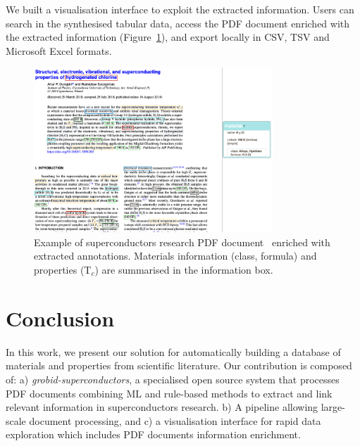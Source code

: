 \documentclass{article}
\newcommand{\tc}{T$_{c}$}
\begin{document}



We built a visualisation interface to exploit the extracted information. 
Users can search in the synthesised tabular data, access the PDF document enriched with the extracted information (Figure~\ref{fig:pdf-annotations}), and export locally in CSV, TSV and Microsoft Excel formats. 

\begin{figure}[ht]
\centering
\includegraphics[width=0.8\textwidth]{sample-pdf-annotations}
\caption{\label{fig:pdf-annotations} Example of superconductors research PDF document~\cite{sample_superconductors_article} enriched with extracted annotations. Materials information (class, formula) and properties (\tc) are summarised in the information box. }
\end{figure}

\section{Conclusion}
\label{sec:conclusion}
In this work, we present our solution for automatically building a database of materials and properties from scientific literature. 
Our contribution is composed of: a) \textit{grobid-superconductors}, a specialised open source system that processes PDF documents combining ML and rule-based methods to extract and link relevant information in superconductors research.
b) A pipeline allowing large-scale document processing, and c) a visualisation interface for rapid data exploration which includes PDF documents information enrichment. 
\end{document}
